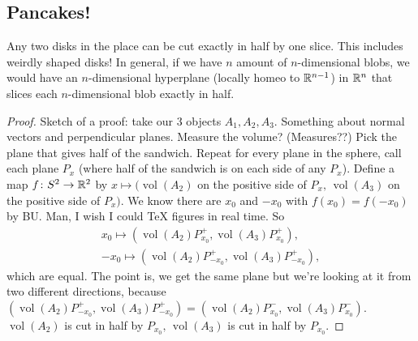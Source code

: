 \subsection{Pancakes!}
\begin{cor}
    Any two disks in the place can be cut exactly in half by one slice. This includes weirdly shaped disks! In general, if we have $n$ amount of $n$-dimensional blobs, we would have an $n$-dimensional hyperplane (locally homeo to $\mathbb{R}^{n-1}$) in $\mathbb{R}^{n}$ that slices each $n$-dimensional blob exactly in half.
\end{cor}
\begin{proof}
    Sketch of a proof: take our $3$ objects $A_1,A_2,A_3$. Something about normal vectors and perpendicular planes. Measure the volume? (Measures??) Pick the plane that gives half of the sandwich. Repeat for every plane in the sphere, call each plane $P_x$ (where half of the sandwich is on each side of any $P_x$). Define a map $f \colon  S^{2}  \to \mathbb{R}^2$ by $x \mapsto (\operatorname{vol}(A_2)$ on the positive side of $P_x, \, \operatorname{vol}(A_3)$ on the positive side of $P_x)$. We know there are  $x_0$ and $-x_0$ with $f(x_0)=f(-x_0)$ by BU. Man, I wish I could \TeX{} figures in real time. So 
    \begin{gather*}
        x_0 \mapsto (\operatorname{vol}(A_2)P_{x_0}^{+},\operatorname{vol}(A_3)P_{x_0}^{+}), \\
        -x_0 \mapsto (\operatorname{vol}(A_2)P_{-x_0}^{+},\operatorname{vol}(A_3)P_{-x_0}^{+}),
    \end{gather*}
    which are equal. The point is, we get the same plane but we're looking at it from two different directions, because $(\operatorname{vol}(A_2)P_{-x_0}^{+},\operatorname{vol}(A_3)P_{-x_0}^{+})=\left( \operatorname{vol}(A_2)P_{x_0}^{-},\operatorname{vol}(A_3) P_{x_0}^{-}\right) $. $\operatorname{vol}(A_2)$ is cut in half by $P_{x_0},\,\operatorname{vol}(A_3)$ is cut in half by $P_{x_0}$.
\end{proof}
